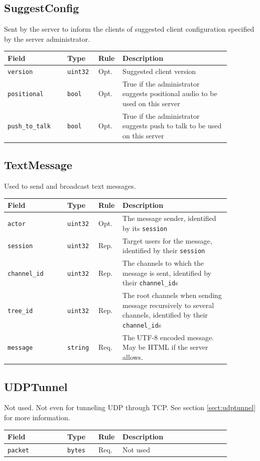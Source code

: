 \documentclass[11pt]{article} %
\newenvironment{mumbleMessageEx}
{%
	\small
	\renewcommand\arraystretch{1.5}
	\begin{tabular}{p{0.25\linewidth}p{0.13\linewidth}p{0.05\linewidth}p{0.45\linewidth}}
	Field & Type & Rule & Description \\
	\hline
}
{%
	\end{tabular}
	\renewcommand\arraystretch{1.0}
}
\newcommand{\mumbleMessageExItem}[4]{ \texttt{#1} & \texttt{#2} & #3 & #4 \\ }
\begin{document}
\subsection{SuggestConfig}
\label{msg:suggestConfig}

Sent by the server to inform the clients of suggested client configuration specified by the server administrator.

\begin{mumbleMessageEx}
\mumbleMessageExItem{version}{uint32}{Opt.}{Suggested client version}
\mumbleMessageExItem{positional}{bool}{Opt.}{True if the administrator suggests positional audio to be used on this server}
\mumbleMessageExItem{push\_to\_talk}{bool}{Opt.}{True if the administrator suggests push to talk to be used on this server}
\end{mumbleMessageEx}

\subsection{TextMessage}
\label{msg:textMessage}

Used to send and broadcast text messages.

\begin{mumbleMessageEx}
\mumbleMessageExItem{actor}{uint32}{Opt.}{The message sender, identified by its \texttt{session}}
\mumbleMessageExItem{session}{uint32}{Rep.}{Target users for the message, identified by their \texttt{session}}
\mumbleMessageExItem{channel\_id}{uint32}{Rep.}{The channels to which the message is sent, identified by their \texttt{channel\_id}s}
\mumbleMessageExItem{tree\_id}{uint32}{Rep.}{The root channels when sending message recursively to several channels, identified by their \texttt{channel\_id}s}
\mumbleMessageExItem{message}{string}{Req.}{The UTF-8 encoded message. May be HTML if the server allows.}
\end{mumbleMessageEx}

\subsection{UDPTunnel}
\label{msg:udpTunnel}

Not used. Not even for tunneling UDP through TCP. See section \ref{sect:udptunnel} for more information.

\begin{mumbleMessageEx}
\mumbleMessageExItem{packet}{bytes}{Req.}{Not used}
\end{mumbleMessageEx}
\end{document}

